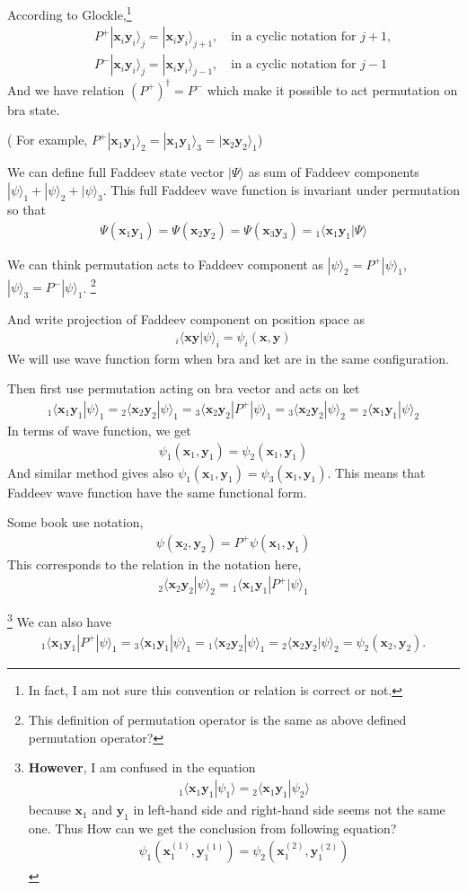 \documentclass[11pt]{article}
\def\bm{\boldsymbol}
\newcommand{\bea}{\begin{eqnarray}}
\newcommand{\eea}{\end{eqnarray}}
\newcommand{\no}{\nonumber \\}
\newcommand{\vx}{{\bm x}}
\newcommand{\vy}{{\bm y}}
\newcommand{\la}{\langle}
\newcommand{\ra}{\rangle}
\begin{document}
According to Glockle,\footnote{In fact, I am not sure
this convention or relation is correct or not.}
\bea
& &P^+|\vx_i \vy_i\ra_{j} =|\vx_i \vy_i\ra_{j+1},\quad 
  \mbox{in a cyclic notation for $j+1$},\no
& &P^-|\vx_i \vy_i\ra_{j} =|\vx_i \vy_i\ra_{j-1},\quad
 \mbox{in a cyclic notation for $j-1$}
\eea
And we have relation $(P^+)^\dagger=P^-$ which make it possible to act permutation on bra state.

( For example, 
$P^+|\vx_1\vy_1\ra_2=|\vx_1\vy_1\ra_3=|\vx_2\vy_2\ra_1$)

We can define full Faddeev state vector $|\Psi\ra$
as sum of Faddeev components $|\psi\ra_1+|\psi\ra_2+|\psi\ra_3$.
This full Faddeev wave function is invariant under permutation
so that
\bea
\Psi(\vx_1 \vy_1)=\Psi(\vx_2 \vy_2)=\Psi(\vx_3 \vy_3)
={}_1\la \vx_1 \vy_1|\Psi\ra
\eea

We can think permutation acts to Faddeev component as
 $|\psi\ra_2=P^+|\psi\ra_1$, 
$|\psi\ra_3=P^-|\psi\ra_1$.
\footnote{This definition of permutation operator is the same as above defined permutation operator?}

And write projection of Faddeev component on position space as
\bea
{}_i\la \vx \vy|\psi\ra_i=\psi_i(\vx,\vy)
\eea
We will use wave function form when bra and ket are in the same
configuration.


Then first use permutation acting on bra vector
and acts on ket
\bea
{}_1\la \vx_1 \vy_1|\psi\ra_1={}_2\la \vx_2 \vy_2|\psi\ra_1
       ={}_3\la \vx_2 \vy_2|P^+|\psi\ra_1
       ={}_3\la \vx_2 \vy_2|\psi\ra_2
       ={}_2\la \vx_1 \vy_1|\psi\ra_2      
\eea
In terms of wave function, we get
\bea
\psi_1(\vx_1,\vy_1)=\psi_2(\vx_1,\vy_1)
\eea
And similar method gives also $\psi_1(\vx_1,\vy_1)=\psi_3(\vx_1,\vy_1)$.
This means that Faddeev wave function have the same functional form.

Some book use notation, 
\bea
\psi(\vx_2,\vy_2)=P^+ \psi(\vx_1,\vy_1)
\eea
This corresponds to the relation in the notation here,
\bea
{}_2\la \vx_2\vy_2|\psi\ra_2
={}_1\la \vx_1 \vy_1|P^+|\psi\ra_1
\eea

\footnote{
{\bf However}, I am confused in the equation 
\bea
{}_1\la\vx_1\vy_1|\psi_1\ra={}_2\la \vx_1\vy_1|\psi_2\ra
\eea
because 
$\vx_1$ and $\vy_1$ in left-hand side 
and right-hand side seems not the same one. Thus
How can we get the conclusion from following equation?
\bea
\psi_1(\vx_1^{(1)},\vy_1^{(1)})=\psi_2(\vx_1^{(2)},\vy_1^{(2)})
\eea


}
We can also have
\bea
{}_1\la \vx_1 \vy_1| P^+|\psi\ra_1
={}_3\la \vx_1 \vy_1|\psi\ra_1={}_1\la \vx_2 \vy_2|\psi\ra_1
={}_2\la \vx_2 \vy_2|\psi\ra_2=\psi_2(\vx_2,\vy_2).
\eea
\end{document}
